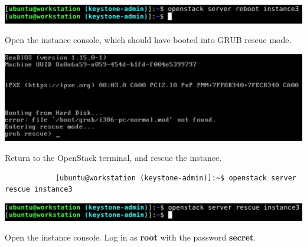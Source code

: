 \documentclass[letterpaper, 12pt]{article}
\begin{document}
\begin{enumerate}
\begin{labstep}
        \begin{center}
            \includegraphics[width=\linewidth]{images/part8/step6.png}
        \end{center}
    \end{labstep}

    \begin{labstep}
        Open the instance console, which should have booted into GRUB rescue mode.

        \begin{center}
            \includegraphics[width=\linewidth]{images/part8/step7.png}
        \end{center}
    \end{labstep}

    \begin{labstep}
        Return to the OpenStack terminal, and rescue the instance.
        \begin{lstlisting}
            [ubuntu@workstation (keystone-admin)]:~$ openstack server rescue instance3
        \end{lstlisting}

        \begin{center}
            \includegraphics[width=\linewidth]{images/part8/step8.png}
        \end{center}
    \end{labstep}

    \begin{labstep}
        Open the instance console.
        Log in as \textbf{root} with the password \textbf{secret}.


\end{labstep}
\end{enumerate}
\end{document}
